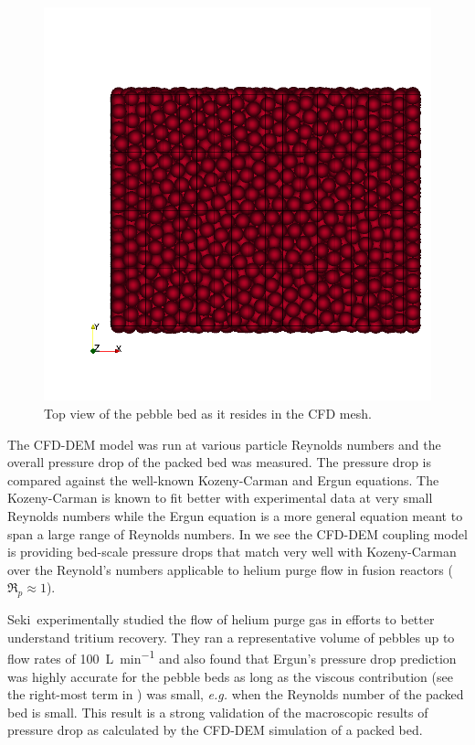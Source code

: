 \begin{figure}[t]
	\centering
	\includegraphics[width=\singleimagewidth]{figures/z-top-view}
    \caption{Top view of the pebble bed as it resides in the CFD mesh.}\label{fig:cfdem-domain-z}
\end{figure}


The CFD-DEM model was run at various particle Reynolds numbers and the overall pressure drop of the packed bed was measured. The pressure drop is compared against the well-known Kozeny-Carman and Ergun equations. The Kozeny-Carman is known to fit better with experimental data at very small Reynolds numbers while the Ergun equation is a more general equation meant to span a large range of Reynolds numbers. In  we see the CFD-DEM coupling model is providing bed-scale pressure drops that match very well with Kozeny-Carman over the Reynold’s numbers applicable to helium purge flow in fusion reactors ($\Re_p \approx 1$). 

Seki\etal~experimentally studied the flow of helium purge gas in efforts to better understand tritium recovery.\cite{Seki2013} They ran a representative volume of pebbles up to flow rates of \SI{100}{\liter\per\minute} and also found that Ergun's pressure drop prediction was highly accurate for the pebble beds as long as the viscous contribution (see the right-most term in ) was small, \textit{e.g.} when the Reynolds number of the packed bed is small. This result is a strong validation of the macroscopic results of pressure drop as calculated by the CFD-DEM simulation of a packed bed.

